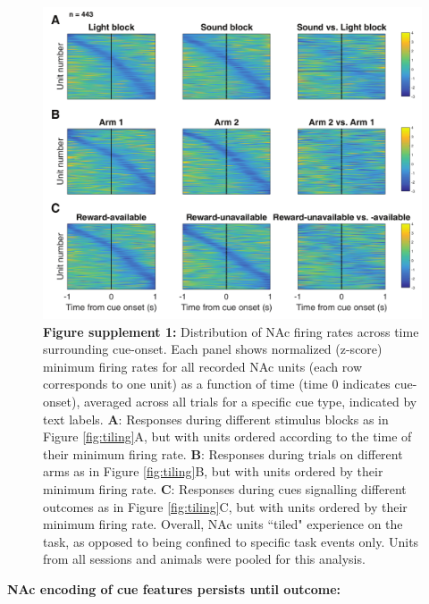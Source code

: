 \documentclass[11pt]{article}
\newcommand{\bsf}[1]{\textbf{#1}}
\providecommand{\DIFadd}[1]{{\protect\color{red} \sf #1}} %
\providecommand{\DIFdel}[1]{} %
\providecommand{\DIFaddbegin}{} %
\providecommand{\DIFaddend}{} %
\providecommand{\DIFdelbegin}{} %
\providecommand{\DIFdelend}{} %
\newcommand{\DIFscaledelfig}{0.5}
\newlength{\DIFdelgraphicswidth} %
\newlength{\DIFdelgraphicsheight} %
\newcommand{\DIFaddincludegraphics}[2][]{{\color{red}\fbox{\DIFOincludegraphics[#1]{#2}}}} %
\newcommand{\DIFdelincludegraphics}[2][]{%
\sbox{\DIFdelgraphicsbox}{\DIFOincludegraphics[#1]{#2}}%
\settoboxwidth{\DIFdelgraphicswidth}{\DIFdelgraphicsbox} %
\settoboxtotalheight{\DIFdelgraphicsheight}{\DIFdelgraphicsbox} %
\scalebox{\DIFscaledelfig}{%
\parbox[b]{\DIFdelgraphicswidth}{\usebox{\DIFdelgraphicsbox}\\[-\baselineskip] \rule{\DIFdelgraphicswidth}{0em}}\llap{\resizebox{\DIFdelgraphicswidth}{\DIFdelgraphicsheight}{%
\setlength{\unitlength}{\DIFdelgraphicswidth}%
\begin{picture}(1,1)%
\thicklines\linethickness{2pt} %
{\color[rgb]{1,0,0}\put(0,0){\framebox(1,1){}}}%
{\color[rgb]{1,0,0}\put(0,0){\line( 1,1){1}}}%
{\color[rgb]{1,0,0}\put(0,1){\line(1,-1){1}}}%
\end{picture}%
}\hspace*{3pt}}} %
} %
\DeclareRobustCommand{\DIFaddbegin}{\DIFOaddbegin \let\includegraphics\DIFaddincludegraphics} %
\DeclareRobustCommand{\DIFaddend}{\DIFOaddend \let\includegraphics\DIFOincludegraphics} %
\DeclareRobustCommand{\DIFdelbegin}{\DIFOdelbegin \let\includegraphics\DIFdelincludegraphics} %
\DeclareRobustCommand{\DIFdelend}{\DIFOaddend \let\includegraphics\DIFOincludegraphics} %
\begin{document}
 \begin{figure}[ht!]
\centering
\includegraphics[width=\textwidth]{Fig 6 - SUPP Task tiling MIN.pdf}
\caption*{\bsf{Figure supplement 1:} Distribution of NAc firing rates across time surrounding cue-onset. Each panel shows normalized (z-score) minimum firing rates for all recorded NAc
units (each row corresponds to one unit) as a function of time (time 0
indicates cue-onset), averaged across all trials for a specific cue type,
indicated by text labels. \bsf{A}: Responses during
different stimulus blocks as in Figure \ref{fig:tiling}A, but with units ordered according to the
time of their minimum firing rate. \bsf{B}: Responses during trials on
different arms as in Figure \ref{fig:tiling}B, but with units ordered by their minimum firing
rate. \bsf{C}: Responses during cues signalling different outcomes as in Figure \ref{fig:tiling}C,
but with units ordered by their minimum firing rate. Overall, NAc units
``tiled" experience on the task, as opposed to being confined to specific task
events only. Units from all sessions and animals were pooled for this
analysis.}
\label{fig:tilingSUPP1}
\end{figure} \clearpage

\DIFaddend {\bf \DIFdelbegin \DIFdel{Encoding }\DIFdelend \DIFaddbegin \DIFadd{NAc encoding }\DIFaddend of cue features persists until outcome:}
\end{document}
